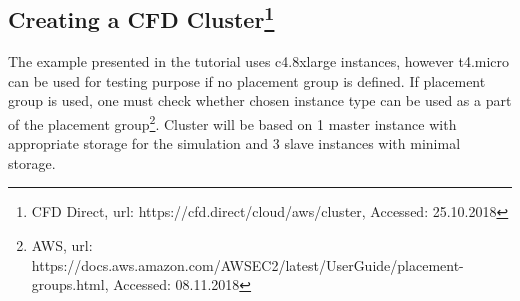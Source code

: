 \documentclass[12pt,english]{article}
\begin{document}
\subsection{Creating a CFD Cluster\footnote{CFD Direct, url: https://cfd.direct/cloud/aws/cluster, Accessed: 25.10.2018}}

The example presented in the tutorial uses c4.8xlarge instances, however t4.micro can be used for testing purpose if no placement group is defined. If placement group is used, one must check whether chosen instance type can be used as a part of the placement group\footnote{AWS, url: https://docs.aws.amazon.com/AWSEC2/latest/UserGuide/placement-groups.html, Accessed: 08.11.2018}. Cluster will be based on 1 master instance with appropriate storage for the simulation and 3 slave instances with minimal storage.
\end{document}
